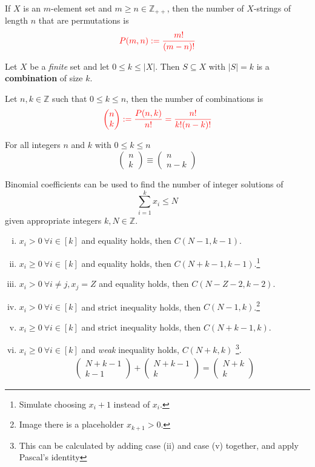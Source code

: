 \documentclass{article}
\def\Z{{\mathbb Z}}
\newcommand{\bi}[2]{\begin{pmatrix}{#1}\\{#2}\end{pmatrix}}
\begin{document}
			\begin{proposition}
				If $X$ is an $m$-element set and $m \geq n \in \Z_{++}$, then the number of $X$-strings of length $n$ that are permutations is 
				\begin{equation}
					\textcolor{red}{P(m, n) := \frac{m!}{(m-n)!}}
				\end{equation}
			\end{proposition}
			
			\begin{definition}
				Let $X$ be a \emph{finite} set and let $0 \leq k \leq |X|$. Then $S \subseteq X$ with $|S| = k$ is a \textbf{combination} of size $k$.
			\end{definition}
			
			\begin{proposition}
				Let $n, k \in \Z$ such that $0 \leq k \leq n$, then the number of combinations is
				\begin{equation}
					\red{\bi{n}{k} := \frac{P(n, k)}{n!} = \frac{n!}{k!(n-k)!}}
				\end{equation}
			\end{proposition}
			
			\begin{proposition}
				For all integers $n$ and $k$ with $0 \leq k \leq n$
				\begin{equation}
					\bi{n}{k} \equiv \bi{n}{n-k}
				\end{equation}
			\end{proposition}
			
			\begin{example}
				Binomial coefficients can be used to find the number of integer solutions of
				\begin{equation}
					\sum_{i=1}^k x_i \leq N
				\end{equation}
				given appropriate integers $k, N \in \Z$.
				\begin{enumerate}[(i)]
					\item $x_i > 0\ \forall i \in [k]$ and equality holds, then $C(N-1, k-1)$.
					\item $x_i \geq 0\ \forall i \in [k]$ and equality holds, then $C(N+k-1, k-1)$.\footnote{Simulate choosing $x_i + 1$ instead of $x_i$.}
					\item $x_i > 0\ \forall i \neq j, x_j = Z$ and equality holds, then $C(N-Z-2,k-2)$.
					\item $x_i > 0\ \forall i \in [k]$ and strict inequality holds, then $C(N-1, k)$.\footnote{Image there is a placeholder $x_{k+1} > 0$.}
					\item $x_i \geq 0\ \forall i \in [k]$ and strict inequality holds, then $C(N+k-1, k)$.
					\item $x_i \geq 0\ \forall i \in [k]$ and \emph{weak} inequality holds, $C(N+k, k)$ \footnote{This can be calculated by adding case (ii) and case (v) together, and apply Pascal's identity}.
					\begin{gather}
						\bi{N+k-1}{k-1} + \bi{N+k-1}{k} = \bi{N+k}{k}
					\end{gather}
				\end{enumerate}
			\end{example}
			
\end{document}
